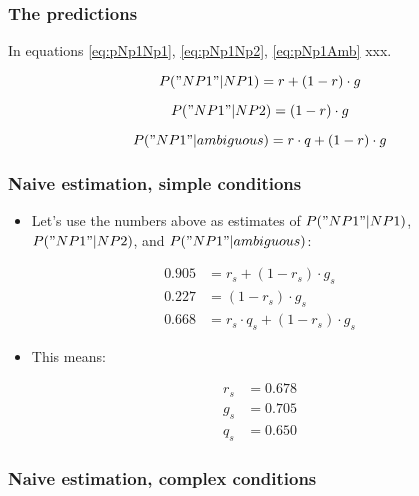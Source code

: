 \documentclass[
  english,
  doc]{apa6}
\providecommand{\tightlist}{%
  \setlength{\itemsep}{0pt}\setlength{\parskip}{0pt}}
\begin{document}
\hypertarget{the-predictions}{%
\subsubsection{The predictions}\label{the-predictions}}

In equations \eqref{eq:pNp1Np1}, \eqref{eq:pNp1Np2}, \eqref{eq:pNp1Amb} xxx.

\begin{equation}
P("NP1"|NP1) = r + (1-r) \cdot g
\label{eq:pNp1Np1}
\end{equation}

\begin{equation}
P("NP1"|NP2) = (1-r) \cdot g
\label{eq:pNp1Np2}
\end{equation}

\begin{equation}
P("NP1"|ambiguous) = r\cdot q + (1-r) \cdot g
\label{eq:pNp1Amb}
\end{equation}

\hypertarget{naive-estimation-simple-conditions}{%
\subsubsection{Naive estimation, simple conditions}\label{naive-estimation-simple-conditions}}

\begin{itemize}
\tightlist
\item
  Let's use the numbers above as estimates of \(P("NP1"|NP1)\), \(P("NP1"|NP2)\), and \(P("NP1"|ambiguous)\):
\end{itemize}

\begin{align*}
  0.905 &= r_s + (1-r_s) \cdot g_s \\ 
  0.227 &= (1-r_s) \cdot g_s \\ 
  0.668 &= r_s\cdot q_s + (1-r_s) \cdot g_s
\end{align*}

\begin{itemize}
\tightlist
\item
  This means:
\end{itemize}

\begin{align*}
  r_s &= 0.678 \\ 
  g_s &= 0.705 \\ 
  q_s &= 0.650
\end{align*}

\hypertarget{naive-estimation-complex-conditions}{%
\subsubsection{Naive estimation, complex conditions}\label{naive-estimation-complex-conditions}}
\end{document}
